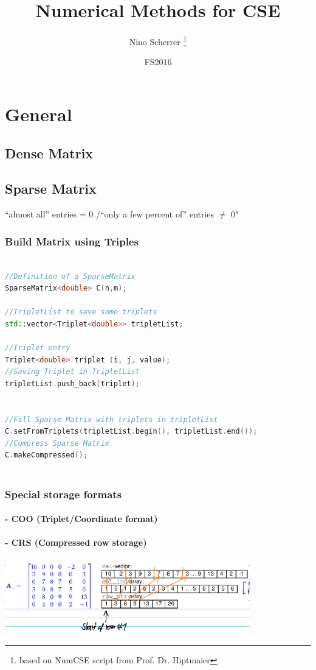 \documentclass[12pt, letterpaper, twoside]{article}
\title{Numerical Methods for CSE}
\author{Nino Scherrer \thanks{based on NumCSE script from Prof. Dr. Hiptmaier}}
\date{FS2016}
\begin{document}
 
\begin{titlepage}
\maketitle
\end{titlepage}
 
 \section{General}

\subsection{Dense Matrix}

\subsection{Sparse Matrix}

“almost all” entries = 0 /“only a few percent of” entries $\not =$ 0"



\subsubsection{Build Matrix using Triples}

\begin{lstlisting}[language=C++, caption=Triplet example]

//Definition of a SparseMatrix
SparseMatrix<double> C(n,m);

//TripletList to save some triplets
std::vector<Triplet<double>> tripletList;

//Triplet entry
Triplet<double> triplet (i, j, value); 	 
//Saving Triplet in TripletList
tripletList.push_back(triplet);


//Fill Sparse Matrix with triplets in tripletList
C.setFromTriplets(tripletList.begin(), tripletList.end());
//Compress Sparse Matrix
C.makeCompressed();
	
\end{lstlisting}


\subsubsection{Special storage formats}
\paragraph{- COO (Triplet/Coordinate format)}
\paragraph{- CRS (Compressed row storage)}
\hspace{2mm}

\includegraphics[width=0.8\textwidth]{SparseMatrix_CRS.png}








 
\end{document}
